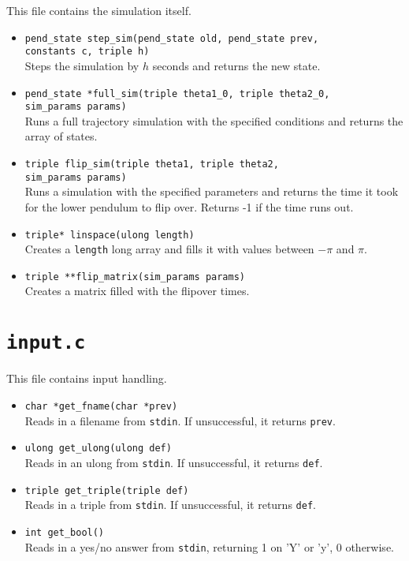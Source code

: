 \documentclass[a4paper,10pt]{article}
\begin{document}
This file contains the simulation itself.
\begin{itemize}
 \item \texttt{pend\_state step\_sim(pend\_state old, pend\_state prev,\\constants c, triple h)}\\
 Steps the simulation by $h$ seconds and returns the new state.
 \item \texttt{pend\_state *full\_sim(triple theta1\_0, triple theta2\_0,\\ sim\_params params)}\\
 Runs a full trajectory simulation with the specified conditions and returns the array of states.
 \item \texttt{triple flip\_sim(triple theta1, triple theta2,\\sim\_params params)}\\
 Runs a simulation with the specified parameters and returns the time it took for the
 lower pendulum to flip over. Returns -1 if the time runs out.
 \item \texttt{triple* linspace(ulong length)}\\
 Creates a \texttt{length} long array and fills it with values between $-\pi$ and $\pi$.
 \item \texttt{triple **flip\_matrix(sim\_params params)}\\
 Creates a matrix filled with the flipover times.
\end{itemize}

\section{\texttt{input.c}}

This file contains input handling.
\begin{itemize}
 \item \texttt{char *get\_fname(char *prev)}\\
 Reads in a filename from \texttt{stdin}. If unsuccessful, it returns \texttt{prev}.
 \item \texttt{ulong get\_ulong(ulong def)}\\
 Reads in an ulong from \texttt{stdin}. If unsuccessful, it returns \texttt{def}.
 \item \texttt{triple get\_triple(triple def)}\\
 Reads in a triple from \texttt{stdin}. If unsuccessful, it returns \texttt{def}.
 \item \texttt{int get\_bool()}\\
 Reads in a yes/no answer from \texttt{stdin}, returning 1 on 'Y' or 'y', 0 otherwise.
\end{itemize}
\end{document}
